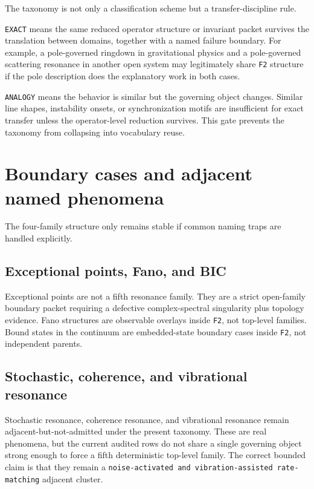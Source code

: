 \documentclass[aps,pra,reprint,nofootinbib]{revtex4-2}
\begin{document}
The taxonomy is not only a classification scheme but a transfer-discipline rule.

\texttt{EXACT} means the same reduced operator structure or invariant packet survives the translation between domains, together with a named failure boundary. For example, a pole-governed ringdown in gravitational physics and a pole-governed scattering resonance in another open system may legitimately share \texttt{F2} structure if the pole description does the explanatory work in both cases.

\texttt{ANALOGY} means the behavior is similar but the governing object changes. Similar line shapes, instability onsets, or synchronization motifs are insufficient for exact transfer unless the operator-level reduction survives. This gate prevents the taxonomy from collapsing into vocabulary reuse.

\section{Boundary cases and adjacent named phenomena}

The four-family structure only remains stable if common naming traps are handled explicitly.

\subsection{Exceptional points, Fano, and BIC}

Exceptional points are not a fifth resonance family. They are a strict open-family boundary packet requiring a defective complex-spectral singularity plus topology evidence. Fano structures are observable overlays inside \texttt{F2}, not top-level families. Bound states in the continuum are embedded-state boundary cases inside \texttt{F2}, not independent parents.

\subsection{Stochastic, coherence, and vibrational resonance}

Stochastic resonance, coherence resonance, and vibrational resonance remain adjacent-but-not-admitted under the present taxonomy. These are real phenomena, but the current audited rows do not share a single governing object strong enough to force a fifth deterministic top-level family. The correct bounded claim is that they remain a \texttt{noise-activated and vibration-assisted rate-matching} adjacent cluster.
\end{document}
